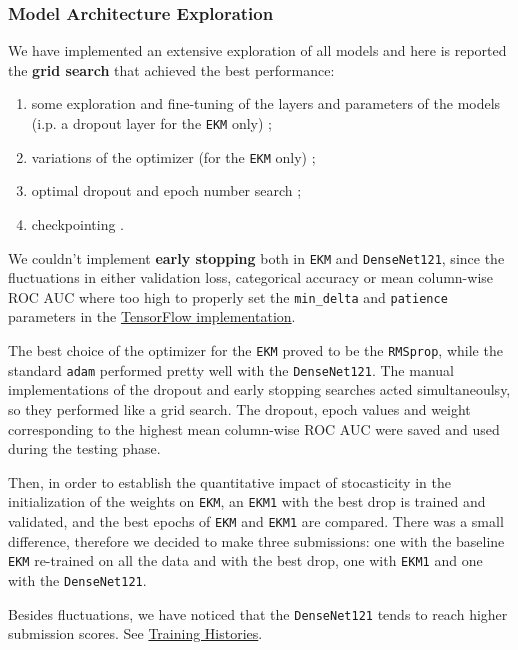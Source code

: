 \documentclass{acm_proc_article-sp}
\providecommand{\tightlist}{%
  \setlength{\itemsep}{0pt}\setlength{\parskip}{0pt}}
\begin{document}
\hypertarget{exploration}{%
\subsubsection{Model Architecture Exploration}\label{exploration}}

We have implemented an extensive exploration of all models and here is
reported the \textbf{grid search} that achieved the best performance:

\begin{enumerate}
\def\labelenumi{\arabic{enumi}.}
\tightlist
\item
  some exploration and fine-tuning of the layers and parameters of the
  models (i.p. a dropout layer for the \texttt{EKM} only) ;
\item
  variations of the optimizer (for the \texttt{EKM} only) ;
\item
  optimal dropout and epoch number search ;
\item
  checkpointing .
\end{enumerate}

We couldn't implement \textbf{early stopping} both in \texttt{EKM} and
\texttt{DenseNet121}, since the fluctuations in either validation loss,
categorical accuracy or mean column-wise ROC AUC where too high to
properly set the \texttt{min\_delta} and \texttt{patience} parameters in
the
\href{https://www.tensorflow.org/api_docs/python/tf/keras/callbacks/EarlyStopping}{TensorFlow
implementation}.

The best choice of the optimizer for the \texttt{EKM} proved to be the
\texttt{RMSprop}, while the standard \texttt{adam} performed pretty well
with the \texttt{DenseNet121}. The manual implementations of the dropout
and early stopping searches acted simultaneoulsy, so they performed like
a grid search. The dropout, epoch values and weight corresponding to the
highest mean column-wise ROC AUC were saved and used during the testing
phase.

Then, in order to establish the quantitative impact of stocasticity in
the initialization of the weights on \texttt{EKM}, an \texttt{EKM1} with
the best drop is trained and validated, and the best epochs of
\texttt{EKM} and \texttt{EKM1} are compared. There was a small
difference, therefore we decided to make three submissions: one with the
baseline \texttt{EKM} re-trained on all the data and with the best drop,
one with \texttt{EKM1} and one with the \texttt{DenseNet121}.

Besides fluctuations, we have noticed that the \texttt{DenseNet121}
tends to reach higher submission scores. See
\protect\hyperlink{training-histories}{Training Histories}.
\end{document}
